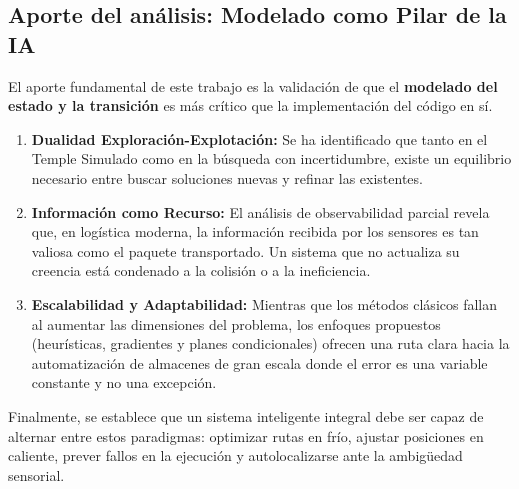 \subsection{Aporte del análisis: Modelado como Pilar de la IA}

El aporte fundamental de este trabajo es la validación de que el \textbf{modelado del estado y la transición} es más crítico que la implementación del código en sí. 

\begin{enumerate}
    \item \textbf{Dualidad Exploración-Explotación:} Se ha identificado que tanto en el Temple Simulado como en la búsqueda con incertidumbre, existe un equilibrio necesario entre buscar soluciones nuevas y refinar las existentes.
    \item \textbf{Información como Recurso:} El análisis de observabilidad parcial revela que, en logística moderna, la información recibida por los sensores es tan valiosa como el paquete transportado. Un sistema que no actualiza su creencia está condenado a la colisión o a la ineficiencia.
    \item \textbf{Escalabilidad y Adaptabilidad:} Mientras que los métodos clásicos fallan al aumentar las dimensiones del problema, los enfoques propuestos (heurísticas, gradientes y planes condicionales) ofrecen una ruta clara hacia la automatización de almacenes de gran escala donde el error es una variable constante y no una excepción.
\end{enumerate}

Finalmente, se establece que un sistema inteligente integral debe ser capaz de alternar entre estos paradigmas: optimizar rutas en frío, ajustar posiciones en caliente, prever fallos en la ejecución y autolocalizarse ante la ambigüedad sensorial.